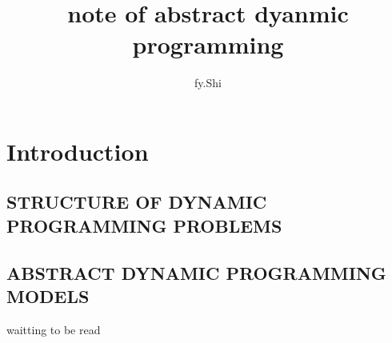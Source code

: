 \documentclass{article}
\title{note of abstract dyanmic programming}
\author{fy.Shi}
\date{}
\begin{document}
\maketitle

\section{Introduction}
\subsection{STRUCTURE OF DYNAMIC PROGRAMMING PROBLEMS}
\subsection{ABSTRACT DYNAMIC PROGRAMMING MODELS}
waitting to be read





\end{document}
